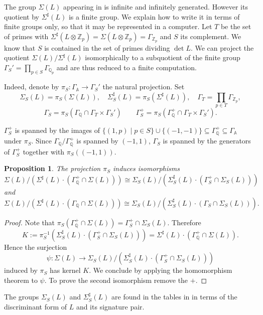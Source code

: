 \documentclass[a4paper]{amsart}
\theoremstyle{definition}
\theoremstyle{plain}
\newtheorem{proposition}[definition]{Proposition}
\newcommand{\QQ}{\mathbb{Q}}
\newcommand{\ZZ}{\mathbb{Z}}
\renewcommand{\AA}{\mathbb{A}}
\begin{document}
The group $\Sigma(L)$ appearing in  is infinite and infinitely generated. However its quotient
by $\Sigma^\sharp(L)$ is a finite group. We explain how to write it in terms of finite groups only, so that it may be represented in a computer.
Let $T$ be the set of primes with $\Sigma^\sharp(L\otimes \ZZ_p)=\Sigma(L\otimes \ZZ_p)=\Gamma_{\ZZ_p}$ and $S$ its complement. We know that $S$ is contained in the set of primes dividing $\det L$.
We can project the quotient $\Sigma(L)/\Sigma^{\sharp}(L)$ isomorphically
to a subquotient of the finite group $ \Gamma_S' = \prod_{p \in S} \Gamma_{\QQ_p}$ and are thus reduced to a finite computation.

Indeed, denote by $\pi_S\colon \Gamma_\AA \to \Gamma_S'$ the natural projection.
Set
\[\Sigma_S(L) = \pi_S(\Sigma(L)), \quad \Sigma^\sharp_S(L)= \pi_S(\Sigma^\sharp(L)),\quad
\Gamma_T=\prod_{p \in T} \Gamma_{\ZZ_p},\]
\[\Gamma_S = \pi_S(\Gamma_\QQ\cap  \Gamma_T \times \Gamma_S') \qquad
\Gamma_S^+=\pi_S(\Gamma^+_\QQ\cap \Gamma_T \times \Gamma_S').\]

$\Gamma_S^+$ is spanned by the images of $\{(1,p) \mid p \in S\} \cup \{(-1,-1)\} \subseteq \Gamma_\QQ^+\subseteq \Gamma_\AA$ under $\pi_S$. Since $\Gamma_\QQ/\Gamma_\QQ^+$ is spanned by $(-1,1)$,
$\Gamma_S$ is spanned by the generators of $\Gamma_S^+$ together with $\pi_S((-1,1))$.

\begin{proposition}
The projection $\pi_S$ induces isomorphisms
\[\Sigma(L)/(\Sigma^\sharp(L)\cdot (\Gamma_\QQ^+ \cap \Sigma(L)))\cong
\Sigma_{S}(L)/(\Sigma^\sharp_S(L)\cdot (\Gamma_S^+ \cap \Sigma_S(L)))\]
and
\[\Sigma(L)/(\Sigma^\sharp(L)\cdot (\Gamma_\QQ \cap \Sigma(L)))\cong
\Sigma_{S}(L)/(\Sigma^\sharp_S(L)\cdot (\Gamma_S \cap \Sigma_S(L))).\]
\end{proposition}
\begin{proof}
Note that $\pi_S(\Gamma_\QQ^+ \cap \Sigma(L)) = \Gamma_S^+ \cap \Sigma_S(L)$.
Therefore
\[K:=\pi_S^{-1}(\Sigma_S^\sharp(L)\cdot(\Gamma^+_S \cap \Sigma_S(L)))=\Sigma^\sharp(L)\cdot(\Gamma_\QQ^+ \cap \Sigma(L)).\]
Hence the surjection
\[\psi \colon \Sigma(L) \to
\Sigma_{S}(L)/(\Sigma^\sharp_S(L)\cdot (\Gamma_S^+ \cap \Sigma_S(L)))\]
induced by $\pi_S$ has kernel $K$. We conclude by applying the homomorphism theorem to $\psi$.
%
%
%
%
%
%
%
%
%
%
%
To prove the second isomorphism remove the $+$.
\end{proof}

The groups $\Sigma_S(L)$ and $\Sigma_S^\sharp(L)$ are found in the tables in \cite[VII]{miranda-morrison} in terms of the discriminant form of $L$ and its signature pair.
\end{document}
